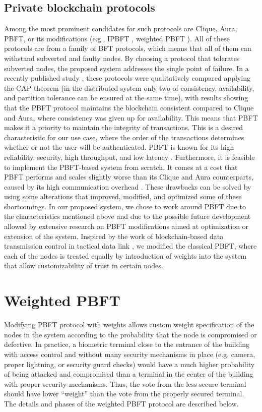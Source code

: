 \subsection{Private blockchain protocols}
\label{Private blockchain protocols}
Among the most prominent candidates for such protocols are Clique, Aura, PBFT, or its modifications (e.g., IPBFT \cite{ImprovedPBFTReputation}, weighted PBFT \cite{TacticalDatalinkPBFTWeighted}). All of these protocols are from a family of BFT protocols, which means that all of them can withstand subverted and faulty nodes. By choosing a protocol that tolerates subverted nodes, the proposed system addresses the single point of failure. In a recently published study \cite{CapTheoremPBFT}, these protocols were qualitatively compared applying the CAP theorem (in the distributed system only two of consistency, availability, and partition tolerance can be ensured at the same time), with results showing that the PBFT protocol maintains the blockchain consistent compared to Clique and Aura, where consistency was given up for availability. This means that PBFT makes it a priority to maintain the integrity of transactions. This is a desired characteristic for our use case, where the order of the transactions determines whether or not the user will be authenticated. PBFT is known for its high reliability, security, high throughput, and low latency \cite{PBFTCLassification}. Furthermore, it is feasible to implement the PBFT-based system from scratch. It comes at a cost that PBFT performs and scales slightly worse than its Clique and Aura counterparts, caused by its high communication overhead \cite{CapTheoremPBFT}. These drawbacks can be solved by using some alterations that improved, modified, and optimized some of these shortcomings. In our proposed system, we chose to work around PBFT due to the characteristics mentioned above and due to the possible future development allowed by extensive research on PBFT modifications aimed at optimization or extension of the system. Inspired by the work of blockchain-based data transmission control in tactical data link \cite{TacticalDatalinkPBFTWeighted}, we modified the classical PBFT, where each of the nodes is treated equally by introduction of weights into the system that allow customizability of trust in certain nodes.

\section{Weighted PBFT}
Modifying PBFT protocol with weights allows custom weight specification of the nodes in the system according to the probability that the node is compromised or defective. In practice, a biometric terminal close to the entrance of the building with access control and without many security mechanisms in place (e.g. camera, proper lightning, or security guard checks) would have a much higher probability of being attacked and compromised than a terminal in the center of the building with proper security mechanisms. Thus, the vote from the less secure terminal should have lower ``weight'' than the vote from the properly secured terminal.
The details and phases of the weighted PBFT protocol are described below.

